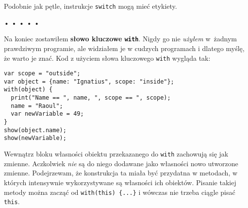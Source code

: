   
Podobnie jak pętle, instrukcje \texttt{switch} mogą mieć etykiety.


\begin{center} 
 • • • • • 
\end{center}

  
Na koniec zostawiłem \textbf{słowo kluczowe \texttt{with}}. Nigdy go nie \emph{użyłem} w~żadnym prawdziwym programie, ale widziałem je w cudzych programach i dlatego myślę, że warto je znać. Kod z użyciem słowa kluczowego \texttt{with} wygląda tak:

\begin{verbatim} 
var scope = "outside";
var object = {name: "Ignatius", scope: "inside"};
with(object) {
  print("Name == ", name, ", scope == ", scope);
  name = "Raoul";
  var newVariable = 49;
}
show(object.name);
show(newVariable);
\end{verbatim}
  
Wewnątrz bloku własności obiektu przekazanego do \texttt{with} zachowują się jak zmienne. Aczkolwiek \emph{nie} są do niego dodawane jako własności nowo utworzone zmienne. Podejrzewam, że konstrukcja ta miała być przydatna w metodach, w których intensywnie wykorzystywane są własności ich obiektów. Pisanie takiej metody można zacząć od \texttt{with(this) \{...\}} i wówczas nie trzeba ciągle pisać \texttt{this}.